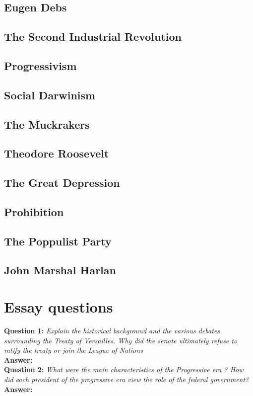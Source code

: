 \documentclass{article}
\begin{document}
\subsection{ Eugen Debs }
\subsection{ The Second Industrial Revolution}
\subsection{ Progressivism}
\subsection{ Social Darwinism}
\subsection{ The Muckrakers}
\subsection{ Theodore Roosevelt}
\subsection{ The Great Depression}
\subsection{ Prohibition}
\subsection{ The Poppulist Party}
\subsection{ John Marshal Harlan}

\section{ Essay questions}
\textbf{Question 1:} \textit{Explain the historical background and the various debates surrounding the Treaty of Versailles. Why did the senate ultimately refuse to ratify the treaty or join the League of Nations}\\
\textbf{Answer:}       \\

\textbf{Question 2:} \textit{What were the main characteristics of the Progressive  era ? How did each president of the progressive era view the role of the federal government?}\\
\textbf{Answer:}       \\
\end{document}
